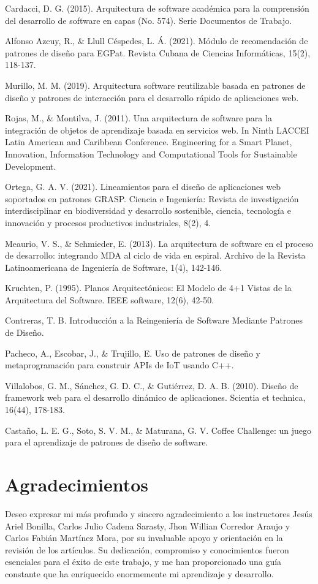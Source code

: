 \documentclass[twocolumn]{article}
\begin{document}
\begin{thebibliography}{99}
 Cardacci, D. G. (2015). Arquitectura de software académica para la comprensión del desarrollo de software en capas (No. 574). Serie Documentos de Trabajo.

 Alfonso Azcuy, R., \& Llull Céspedes, L. Á. (2021). Módulo de recomendación de patrones de diseño para EGPat. Revista Cubana de Ciencias Informáticas, 15(2), 118-137.

 Murillo, M. M. (2019). Arquitectura software reutilizable basada en patrones de diseño y patrones de interacción para el desarrollo rápido de aplicaciones web.

 Rojas, M., \& Montilva, J. (2011). Una arquitectura de software para la integración de objetos de aprendizaje basada en servicios web. In Ninth LACCEI Latin American and Caribbean Conference. Engineering for a Smart Planet, Innovation, Information Technology and Computational Tools for Sustainable Development.

 Ortega, G. A. V. (2021). Lineamientos para el diseño de aplicaciones web soportados en patrones GRASP. Ciencia e Ingeniería: Revista de investigación interdisciplinar en biodiversidad y desarrollo sostenible, ciencia, tecnología e innovación y procesos productivos industriales, 8(2), 4.

 Meaurio, V. S., \& Schmieder, E. (2013). La arquitectura de software en el proceso de desarrollo: integrando MDA al ciclo de vida en espiral. Archivo de la Revista Latinoamericana de Ingeniería de Software, 1(4), 142-146.

 Kruchten, P. (1995). Planos Arquitectónicos: El Modelo de 4+1 Vistas de la Arquitectura del Software. IEEE software, 12(6), 42-50.

 Contreras, T. B. Introducción a la Reingeniería de Software Mediante Patrones de Diseño.

 Pacheco, A., Escobar, J., \& Trujillo, E. Uso de patrones de diseño y metaprogramación para construir APIs de IoT usando C++.

 Villalobos, G. M., Sánchez, G. D. C., \& Gutiérrez, D. A. B. (2010). Diseño de framework web para el desarrollo dinámico de aplicaciones. Scientia et technica, 16(44), 178-183.

 Castaño, L. E. G., Soto, S. V. M., \& Maturana, G. V. Coffee Challenge: un juego para el aprendizaje de patrones de diseño de software.
\end{thebibliography}
\section{Agradecimientos}
Deseo expresar mi más profundo y sincero agradecimiento a los instructores Jesús Ariel Bonilla, Carlos Julio Cadena Sarasty, Jhon Willian Corredor Araujo y Carlos Fabián Martínez Mora, por su invaluable apoyo y orientación en la revisión de los artículos. Su dedicación, compromiso y conocimientos fueron esenciales para el éxito de este trabajo, y me han proporcionado una guía constante que ha enriquecido enormemente mi aprendizaje y desarrollo.
\end{document}
